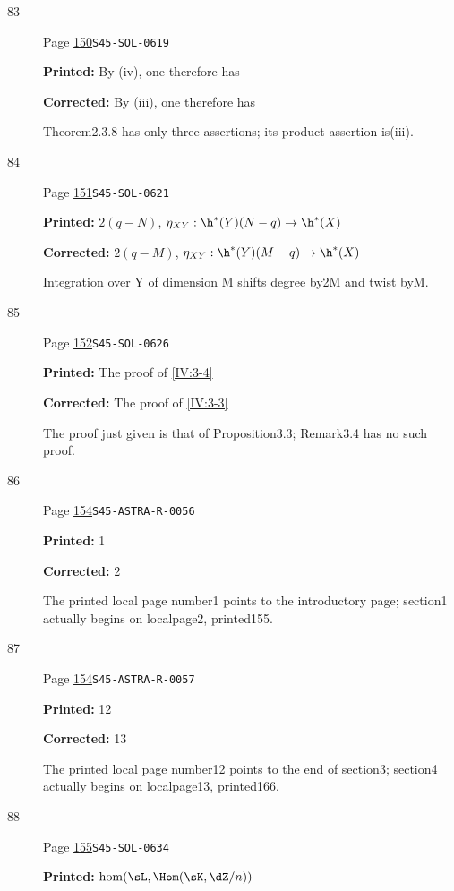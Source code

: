 \begin{description}
\item[\hypertarget{apparatus:EN-0083}{83}] Page \hyperlink{printpage:en:150}{150}\quad\texttt{S45-SOL-0619}
\par\noindent\textbf{Printed:} By (iv), one therefore has
\par\noindent\textbf{Corrected:} By (iii), one therefore has
\par\noindent Theorem2.3.8 has only three assertions; its product assertion is(iii).
\smallskip
\item[\hypertarget{apparatus:EN-0084}{84}] Page \hyperlink{printpage:en:151}{151}\quad\texttt{S45-SOL-0621}
\par\noindent\textbf{Printed:} $2(q-N)$, $\eta_{XY}:\h^*(Y)(N-q)\to \h^*(X)$
\par\noindent\textbf{Corrected:} $2(q-M)$, $\eta_{XY}:\h^*(Y)(M-q)\to \h^*(X)$
\par\noindent Integration over Y of dimension M shifts degree by2M and twist byM.
\smallskip
\item[\hypertarget{apparatus:EN-0085}{85}] Page \hyperlink{printpage:en:152}{152}\quad\texttt{S45-SOL-0626}
\par\noindent\textbf{Printed:} The proof of \ref{IV:3-4}
\par\noindent\textbf{Corrected:} The proof of \ref{IV:3-3}
\par\noindent The proof just given is that of Proposition3.3; Remark3.4 has no such proof.
\smallskip
\item[\hypertarget{apparatus:EN-0086}{86}] Page \hyperlink{printpage:en:154}{154}\quad\texttt{S45-ASTRA-R-0056}
\par\noindent\textbf{Printed:} 1
\par\noindent\textbf{Corrected:} 2
\par\noindent The printed local page number1 points to the introductory page; section1 actually begins on localpage2, printed155.
\smallskip
\item[\hypertarget{apparatus:EN-0087}{87}] Page \hyperlink{printpage:en:154}{154}\quad\texttt{S45-ASTRA-R-0057}
\par\noindent\textbf{Printed:} 12
\par\noindent\textbf{Corrected:} 13
\par\noindent The printed local page number12 points to the end of section3; section4 actually begins on localpage13, printed166.
\smallskip
\item[\hypertarget{apparatus:EN-0088}{88}] Page \hyperlink{printpage:en:155}{155}\quad\texttt{S45-SOL-0634}
\par\noindent\textbf{Printed:} \(\hom(\sL,\Hom(\sK,\dZ/n))\)

\end{description}
